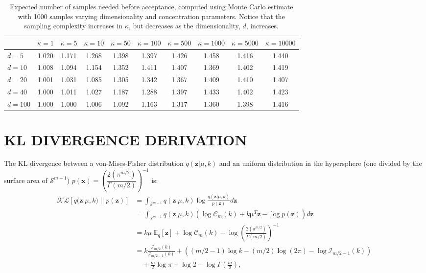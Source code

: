 \documentclass[letterpaper]{article}
\newcommand{\x}{\mathbf{x}}
\newcommand{\z}{\mathbf{z}}
\begin{document}
\begin{table}[H]
  \centering
    \caption{Expected number of samples needed before acceptance, computed using Monte Carlo estimate with 1000 samples varying dimensionality and concentration parameters. Notice that the sampling complexity increases in $\kappa$, but decreases as the dimensionality, $d$, increases.}
    \bigskip
    \begin{tabular}{l|ccccccccc}
    \toprule
    & $\kappa=1$ & $\kappa=5$ & $\kappa=10$ & $\kappa=50$ & $\kappa=100$ & $\kappa=500$ & $\kappa=1000$ & $\kappa=5000$ & $\kappa=10000$ \\
    \midrule
$d=5$ & 1.020 & 1.171 & 1.268 & 1.398 & 1.397 & 1.426 & 1.458 & 1.416 & 1.440\\
$d=10$ & 1.008 & 1.094 & 1.154 & 1.352 & 1.411 & 1.407 & 1.369 & 1.402 & 1.419\\
$d=20$ & 1.001 & 1.031 & 1.085 & 1.305 & 1.342 & 1.367 & 1.409 & 1.410 & 1.407\\
$d=40$ & 1.000 & 1.011 & 1.027 & 1.187 & 1.288 & 1.397 & 1.433 & 1.402 & 1.423\\
$d=100$ & 1.000 & 1.000 & 1.006 & 1.092 & 1.163 & 1.317 & 1.360 & 1.398 & 1.416\\
    \bottomrule
    \end{tabular}
\end{table}

\section{KL DIVERGENCE DERIVATION}\label{ap:kl-divergence}


The KL divergence between a von-Mises-Fisher distribution $q(\z| \mu, k)$ and an uniform distribution in the hypersphere (one divided by the surface area of $\mathcal{S}^{m-1}$) $p(\x) = \left( \dfrac{2(\pi^{m/2})}{\Gamma(m/2)} \right)^{-1}$ is:
\begin{align}
    \mathcal{KL}[q(\z|\mu, k) \; || \;p(\z)] &= \int_{\mathcal{S}^{m-1}} q(\z|\mu, k) \log \frac{q(\z|\mu, k)}{p(\z)} d\z \\
    &= \int_{\mathcal{S}^{m-1}} q(\z|\mu, k) \left( \log \mathcal{C}_m (k) + k \mathbf{\mu}^T \z - \log p(\z) \right) d\z 
    \\
    &= k \mu\; \mathbb{E}_q[\z] + \log \mathcal{C}_m(k) - \log \left( \frac{2(\pi^{m/2})}{\Gamma(m/2)} \right)^{-1} \\
    &= k \frac{\mathcal{I}_{m/2}(k)}{\mathcal{I}_{m/2 - 1}(k)} + \left( (m/2 - 1) \log k - (m/2) \log(2\pi) - \log \mathcal{I}_{m/2 - 1}(k)  \right) \\ &\quad + \frac{m}{2} \log \pi + \log 2 - \log  \Gamma(\frac{m}{2}), \nonumber
\end{align}
\end{document}
